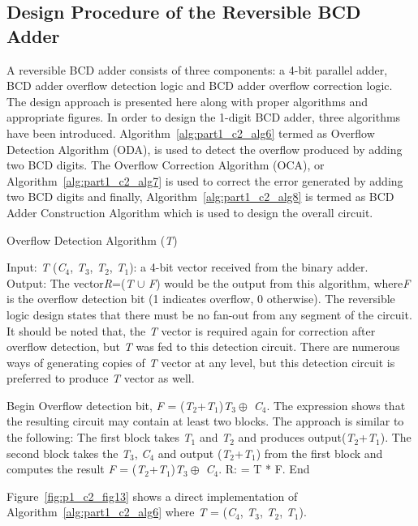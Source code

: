 \subsection{Design Procedure of the Reversible BCD Adder}

A reversible BCD adder consists of three components: a 4-bit parallel adder, BCD adder overflow detection logic and BCD adder overflow correction logic. The design approach is presented here along with proper algorithms and appropriate figures. In order to design the 1-digit BCD adder, three algorithms have been introduced. Algorithm~\ref{alg:part1_c2_alg6} termed as Overflow Detection Algorithm (ODA), is used to detect the overflow produced by adding two BCD digits. The Overﬂow Correction Algorithm (OCA), or Algorithm~\ref{alg:part1_c2_alg7} is used to correct the error generated by adding two BCD digits and finally, Algorithm~\ref{alg:part1_c2_alg8} is termed as BCD Adder Construction Algorithm which is used to design the overall circuit.


\begin{algorithm}[!tbh]
	\caption{Overflow Detection Algorithm ({\it T})}
	\label{alg:part1_c2_alg6}
	Input: {\it T }({\it C}${}_{4}$, {\it T}${}_{3}$, {\it T}${}_{2}$, {\it T}${}_{1}$): a 4-bit vector received from the binary adder.\\
	Output: The vector{\it R}=({\it T} ${\cup }$ {\it F}) would be the output from this algorithm, where{\it F} is the overflow detection bit (1 indicates overflow, 0 otherwise). The reversible logic design states that there must be no fan-out from any segment of the circuit. It should be noted that, the {\it T }vector is required again for correction after overflow detection, but {\it T }was fed to this detection circuit. There are numerous ways of generating copies of {\it T }vector at any level, but this detection circuit is preferred to produce {\it T }vector as well.
	\begin{algorithmic}[1]
		\STATE Begin
		\STATE Overflow detection bit, {\it F }= ({\it T}${}_{2}$+{\it T}${}_{1}$){\it T}${}_{3}\oplus$ {\it C}${}_{4}$. The expression shows that the resulting circuit may contain at least two blocks. The approach is similar to the following:
		\STATE The first block takes {\it T}${}_{1}$ and {\it T}${}_{2}$ and produces output({\it T}${}_{2}$+{\it T}${}_{1}$).
		\STATE The second block takes the {\it T}${}_{3}$, {\it C}${}_{4}$ and output ({\it T}${}_{2}$+{\it T}${}_{1}$) from the first block and computes the result {\it F } = ({\it T}${}_{2}$+{\it T}${}_{1}$){\it T}${}_{3}\oplus$ {\it C}${}_{4}$.
		 R: = T * F.
		\STATE End
	\end{algorithmic}
\end{algorithm}
\begin{example}\textnormal{
	Figure~\ref{fig:p1_c2_fig13} shows a direct implementation of Algorithm~\ref{alg:part1_c2_alg6} where {\it T }= ({\it C}${}_{4}$, {\it T}${}_{3}$, {\it T}${}_{2}$, {\it T}${}_{1}$).}
	
\end{example}

